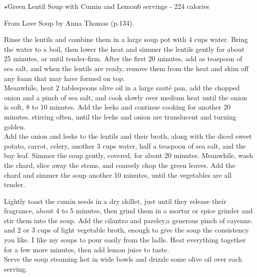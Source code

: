 \begin{recipe}{\texorpdfstring{$\star$}{str}Green Lentil Soup with Cumin and Lemon}{6 servings - 224 calories}{}

\freeform From {\normalfont Love Soup} by Anna Thomas (p.134).


Rinse the lentils and combine them in a large soup pot with 4 cups water. Bring the water to a boil, then lower the heat and simmer the lentils gently for about 25 minutes, or until tender-firm. After the first 20 minutes, add as teaspoon of sea salt, and when the lentils are ready, remove them from the heat and skim off any foam that may have formed on top.\\

Meanwhile, heat 2 tablespoons olive oil in a large sauté pan, add the chopped onion and a pinch of sea salt, and cook slowly over medium heat until the onion is soft, 8 to 10 minutes. Add the leeks and continue cooking for another 20 minutes, stirring often, until the leeks and onion are translucent and turning golden.\\

Add the onion and leeks to the lentils and their broth, along with the diced sweet potato, carrot, celery, another 3 cups water, half a teaspoon of sea salt, and the bay leaf. Simmer the soup gently, covered, for about 20 minutes. Meanwhile, wash the chard, slice away the stems, and coarsely chop the green leaves. Add the chard and simmer the soup another 10 minutes, until the vegetables are all tender.\newpage

Lightly toast the cumin seeds in a dry skillet, just until they release their fragrance, about 4 to 5 minutes, then grind them in a mortar or spice grinder and stir them into the soup. Add the cilantro and parsley,a generous pinch of cayenne. and 2 or 3 cups of light vegetable broth, enough to give the soup the consistency you like. I like my soups to pour easily from the ladle. Heat everything together for a few more minutes, then add lemon juice to taste.\\

Serve the soup steaming hot in wide bowls and drizzle some olive oil over each serving.

\end{recipe}